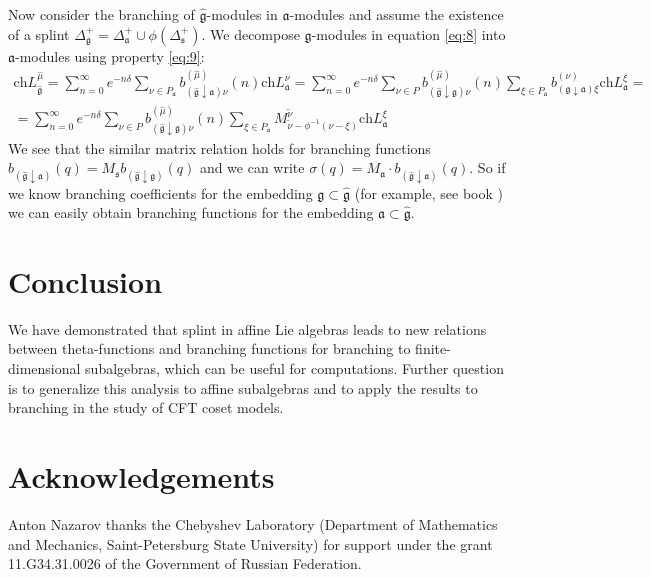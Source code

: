\documentclass[12pt]{article}
\newcommand{\gf}{\mathfrak{g}}
\newcommand{\af}{\mathfrak{a}}
\newcommand{\sfr}{\mathfrak{s}}
\newcommand{\gfh}{\hat{\mathfrak{g}}}
\begin{document}
Now consider the branching of $\gfh$-modules in $\af$-modules and
assume the existence of a splint
$\Delta^{+}_{\gf}=\Delta^{+}_{\af}\cup \phi(\Delta^{+}_{\sfr})$.
We decompose $\gf$-modules in equation \eqref{eq:8} into
$\af$-modules using property \eqref{eq:9}:
\begin{multline}
  \label{eq:10}
  \mathrm{ch}L^{\hat{\mu}}_{\gfh}=
\sum_{n=0}^{\infty}e^{-n\delta} \sum_{\nu\in P_{\af}} b^{(\hat{\mu})}_{(\gfh\downarrow\af)\nu}(n) \mathrm{ch} L^{\nu}_{\af}=
\sum_{n=0}^{\infty} e^{-n\delta} \sum_{\nu\in P} b^{(\hat{\mu})}_{(\gfh\downarrow\gf )\nu}(n) \sum_{\xi\in P_{\af}} b^{(\nu)}_{(\gf\downarrow \af) \xi}\mathrm{ch} L^{\xi}_{\af}=\\
=\sum_{n=0}^{\infty} e^{-n\delta} \sum_{\nu\in P} b^{(\hat{\mu})}_{(\gfh\downarrow\gf )\nu}(n) \sum_{\xi\in P_{\af}} M^{\widetilde{\nu}}_{  \widetilde{\nu}-\phi^{-1}( \nu-\xi )}\mathrm{ch} L^{\xi}_{\af}
\end{multline}
We see that the similar matrix relation holds for branching
functions $b_{(\gfh\downarrow\af)}(q)= M_{\sfr}
b_{(\gfh\downarrow\gf)}(q)$ and we can write
$\sigma(q)=M_{\af}\cdot b_{(\gfh\downarrow\af)}(q)$. So if we know
branching coefficients for the embedding $\gf\subset\gfh$ (for
example, see book \cite{kass1990ala}) we can easily obtain
branching functions for the embedding $\af\subset \gfh$.
\section*{Conclusion}
\label{sec:conclusion} We have demonstrated that splint in affine
Lie algebras leads to new relations between theta-functions and
branching functions for branching to finite-dimensional
subalgebras, which can be useful for computations. Further
question is to generalize this analysis to affine subalgebras and
to apply the results to branching in the study of CFT coset
models.

\section*{Acknowledgements}
\label{sec:acknowledgements}
Anton Nazarov thanks the Chebyshev Laboratory (Department of Mathematics and Mechanics,
Saint-Petersburg State University) for support under the grant 11.G34.31.0026
of the Government of Russian Federation.
\end{document}
